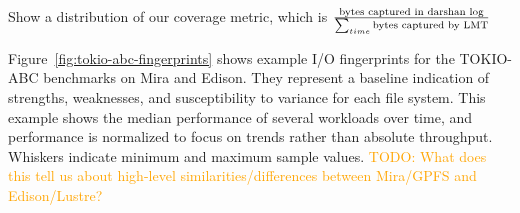 \documentclass[conference,10pt,compsocconf]{IEEEtran}
\newcommand{\todo}[1]{\textcolor{Orange}{TODO: #1}}
\begin{document}
%
% 
% 

Show a distribution of our coverage metric, which is \( {\textup{bytes captured
in darshan log}} \over {\sum_{time}^{ }{\textup{bytes captured by LMT}}} \)

Figure~\ref{fig:tokio-abc-fingerprints} shows example I/O fingerprints for the
TOKIO-ABC benchmarks on Mira and Edison.  They represent a baseline indication
of strengths, weaknesses, and susceptibility to variance for each file system.
This example shows the median performance of several workloads over time, and
performance is normalized to focus on trends rather than absolute throughput.
Whiskers indicate minimum and maximum sample values. \todo{What does this tell
us about high-level similarities/differences between Mira/GPFS and
Edison/Lustre?}
\end{document}
